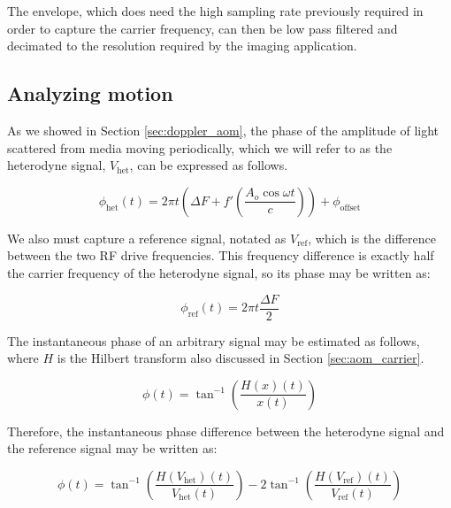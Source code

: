 The envelope, which does need the high sampling rate previously required in order to capture the carrier frequency, can then be low pass filtered and decimated to the resolution required by the imaging application.

\subsection{Analyzing motion}
\label{sec:sigproc_mo_anal}


As we showed in Section \ref{sec:doppler_aom}, the phase of the amplitude of light scattered from media moving periodically, which we will refer to as the heterodyne signal, $V_{\mathrm{het}}$, can be expressed as follows.

\begin{equation}
\phi_{\mathrm{het}}(t) = 2 \pi t \left(\Delta F + f' \left( \frac{A_o \cos{\omega t}}{c} \right)   \right) + \phi_{\mathrm{offset}}
\end{equation}

We also must capture a reference signal, notated as $V_{\mathrm{ref}}$, which is the difference between the two RF drive frequencies. This frequency difference is exactly half the carrier frequency of the heterodyne signal, so its phase may be written as:

\begin{equation}
\phi_{\mathrm{ref}}(t) = 2 \pi t \frac{\Delta F}{2}
\end{equation}

The instantaneous phase of an arbitrary signal may be estimated as follows, where $H$ is the Hilbert transform also discussed in Section \ref{sec:aom_carrier}.

\begin{equation}
\phi(t) = \tan^{-1} \left( \frac{H(x)(t)}{x(t)} \right)
\end{equation}

Therefore, the instantaneous phase difference between the heterodyne signal and the reference signal may be written as:

\begin{equation}
\phi(t) = \tan^{-1}\left( \frac{H(V_{\mathrm{het}})(t)}{V_{\mathrm{het}}(t)} \right) - 2\tan^{-1}\left( \frac{H(V_{\mathrm{ref}})(t)}{V_{\mathrm{ref}}(t)} \right)
\end{equation}

